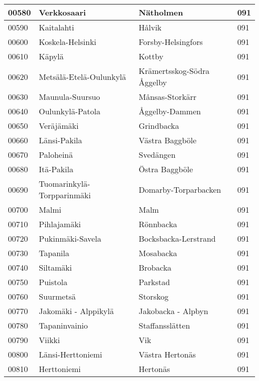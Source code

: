 \begin{center}
\begin{longtable}{|l l l l|}
        00580 & Verkkosaari & Nätholmen & 091 \\ [0.25ex] \hline
        00590 & Kaitalahti & Hålvik & 091 \\ [0.25ex] \hline
        00600 & Koskela-Helsinki & Forsby-Helsingfors & 091 \\ [0.25ex] \hline
        00610 & Käpylä & Kottby & 091 \\ [0.25ex] \hline
        00620 & Metsälä-Etelä-Oulunkylä & Krämertsskog-Södra Åggelby & 091 \\ [0.25ex] \hline
        00630 & Maunula-Suursuo & Månsas-Storkärr & 091 \\ [0.25ex] \hline
        00640 & Oulunkylä-Patola & Åggelby-Dammen & 091 \\ [0.25ex] \hline
        00650 & Veräjämäki & Grindbacka & 091 \\ [0.25ex] \hline
        00660 & Länsi-Pakila & Västra Baggböle & 091 \\ [0.25ex] \hline
        00670 & Paloheinä & Svedängen & 091 \\ [0.25ex] \hline
        00680 & Itä-Pakila & Östra Baggböle & 091 \\ [0.25ex] \hline
        00690 & Tuomarinkylä-Torpparinmäki & Domarby-Torparbacken & 091 \\ [0.25ex] \hline
        00700 & Malmi & Malm & 091 \\ [0.25ex] \hline
        00710 & Pihlajamäki & Rönnbacka & 091 \\ [0.25ex] \hline
        00720 & Pukinmäki-Savela & Bocksbacka-Lerstrand & 091 \\ [0.25ex] \hline
        00730 & Tapanila & Mosabacka & 091 \\ [0.25ex] \hline
        00740 & Siltamäki & Brobacka & 091 \\ [0.25ex] \hline
        00750 & Puistola & Parkstad & 091 \\ [0.25ex] \hline
        00760 & Suurmetsä & Storskog & 091 \\ [0.25ex] \hline
        00770 & Jakomäki - Alppikylä & Jakobacka - Alpbyn & 091 \\ [0.25ex] \hline
        00780 & Tapaninvainio & Staffansslätten & 091 \\ [0.25ex] \hline
        00790 & Viikki & Vik & 091 \\ [0.25ex] \hline
        00800 & Länsi-Herttoniemi & Västra Hertonäs & 091 \\ [0.25ex] \hline
        00810 & Herttoniemi & Hertonäs & 091 \\ [0.25ex] \hline

\end{longtable}
\end{center}
